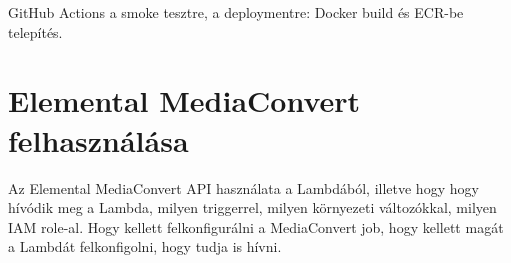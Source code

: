 GitHub Actions a smoke tesztre, a deploymentre: Docker build és ECR-be telepítés.

\section{Elemental MediaConvert felhasználása}

Az Elemental MediaConvert API használata a Lambdából, illetve hogy hogy hívódik meg a Lambda, milyen triggerrel, milyen környezeti változókkal, milyen IAM role-al. Hogy kellett felkonfigurálni a MediaConvert job, hogy kellett magát a Lambdát felkonfigolni, hogy tudja is hívni.
